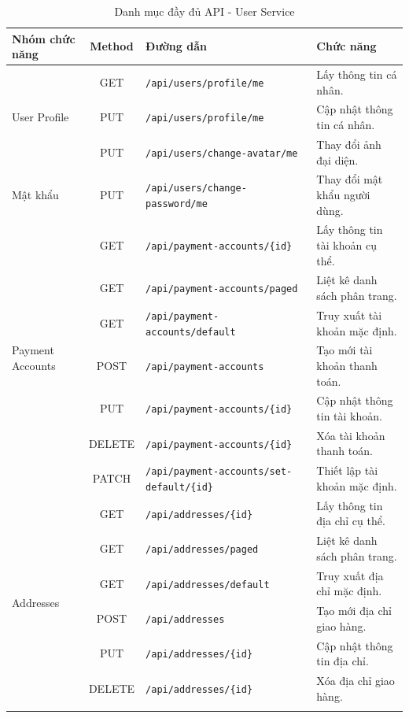\begin{table}[H]
\centering
\caption{Danh mục đầy đủ API - User Service}
\label{tab:full_user_api_appendix}
\begin{tabular}{|l|c|l|l|}
\hline
\textbf{Nhóm chức năng} & \textbf{Method} & \textbf{Đường dẫn} & \textbf{Chức năng} \\ \hline
\multirow{3}{*}{User Profile} & GET & \texttt{/api/users/profile/me} & Lấy thông tin cá nhân. \\ \cline{2-4} 
 & PUT & \texttt{/api/users/profile/me} & Cập nhật thông tin cá nhân. \\ \cline{2-4} 
 & PUT & \texttt{/api/users/change-avatar/me} & Thay đổi ảnh đại diện. \\ \hline
Mật khẩu & PUT & \texttt{/api/users/change-password/me} & Thay đổi mật khẩu người dùng. \\ \hline
\multirow{7}{*}{Payment Accounts} & GET & \texttt{/api/payment-accounts/\{id\}} & Lấy thông tin tài khoản cụ thể. \\ \cline{2-4} 
 & GET & \texttt{/api/payment-accounts/paged} & Liệt kê danh sách phân trang. \\ \cline{2-4} 
 & GET & \texttt{/api/payment-accounts/default} & Truy xuất tài khoản mặc định. \\ \cline{2-4} 
 & POST & \texttt{/api/payment-accounts} & Tạo mới tài khoản thanh toán. \\ \cline{2-4} 
 & PUT & \texttt{/api/payment-accounts/\{id\}} & Cập nhật thông tin tài khoản. \\ \cline{2-4} 
 & DELETE & \texttt{/api/payment-accounts/\{id\}} & Xóa tài khoản thanh toán. \\ \cline{2-4} 
 & PATCH & \texttt{/api/payment-accounts/set-default/\{id\}} & Thiết lập tài khoản mặc định. \\ \hline
\multirow{7}{*}{Addresses} & GET & \texttt{/api/addresses/\{id\}} & Lấy thông tin địa chỉ cụ thể. \\ \cline{2-4} 
 & GET & \texttt{/api/addresses/paged} & Liệt kê danh sách phân trang. \\ \cline{2-4} 
 & GET & \texttt{/api/addresses/default} & Truy xuất địa chỉ mặc định. \\ \cline{2-4} 
 & POST & \texttt{/api/addresses} & Tạo mới địa chỉ giao hàng. \\ \cline{2-4} 
 & PUT & \texttt{/api/addresses/\{id\}} & Cập nhật thông tin địa chỉ. \\ \cline{2-4} 
 & DELETE & \texttt{/api/addresses/\{id\}} & Xóa địa chỉ giao hàng. \\ \cline{2-4} 

\end{tabular}
\end{table}
